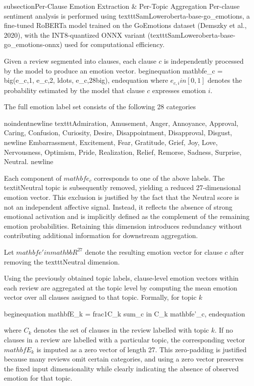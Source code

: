 subsection{Per-Clause Emotion Extraction & Per-Topic Aggregation}
Per-clause sentiment analysis is performed using texttt{SamLoweroberta-base-go_emotions}, a fine-tuned RoBERTa model trained on the GoEmotions dataset (Demszky et al., 2020), with the INT8-quantized ONNX variant (texttt{SamLoweroberta-base-go_emotions-onnx}) used for computational efficiency.

Given a review segmented into clauses, each clause $c$ is independently processed by the model to produce an emotion vector.
begin{equation}
mathbf{e}_c = big(e_{c,1}, e_{c,2}, ldots, e_{c,28}big),
end{equation}
where $e_{c,i} in [0,1]$ denotes the probability estimated by the model that clause $c$ expresses emotion $i$.

The full emotion label set consists of the following 28 categories

noindentnewline
texttt{Admiration, Amusement, Anger, Annoyance, Approval, Caring, Confusion, Curiosity, Desire, Disappointment, Disapproval, Disgust, newline Embarrassment, Excitement, Fear, Gratitude, Grief, Joy, Love, Nervousness, Optimism, Pride, Realization, Relief, Remorse, Sadness, Surprise, Neutral.}
newline

Each component of $mathbf{e}_c$ corresponds to one of the above labels. The textit{Neutral} topic is subsequently removed, yielding a reduced 27-dimensional emotion vector. This exclusion is justified by the fact that the Neutral score is not an independent affective signal. Instead, it reflects the absence of strong emotional activation and is implicitly defined as the complement of the remaining emotion probabilities. Retaining this dimension introduces redundancy without contributing additional information for downstream aggregation.

Let $mathbf{e}'in mathbb{R}^{27}$ denote the resulting emotion vector for clause $c$ after removing the texttt{Neutral} dimension.

Using the previously obtained topic labels, clause-level emotion vectors within each review are aggregated at the topic level by computing the mean emotion vector over all clauses assigned to that topic. Formally, for topic $k$

begin{equation}
mathbf{E}_k = frac{1}{C_k} sum_{c in C_k} mathbf{e}'_c,
end{equation}

where $C_k$ denotes the set of clauses in the review labelled with topic $k$. If no clauses in a review are labelled with a particular topic, the corresponding vector $mathbf{E}_k$ is imputed as a zero vector of length 27. This zero-padding is justified because many reviews omit certain categories, and using a zero vector preserves the fixed input dimensionality while clearly indicating the absence of observed emotion for that topic.


